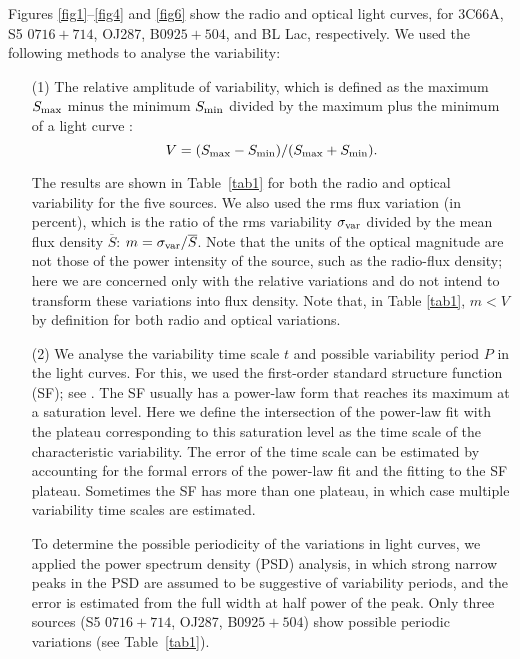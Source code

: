 \documentclass[a4paper,fleqn,usenatbib]{mnras}
\begin{document}
Figures \ref{fig1}--\ref{fig4} and \ref{fig6} show the radio and optical light curves, for 3C66A, S5 \(0716+714\), OJ287, B\(0925+504\), and BL Lac, respectively. We used the following methods to analyse the variability:
\begin{itemize}
\item[(1)] The relative amplitude of variability, which is defined as the maximum \(S_{\rm max}\) minus the minimum \(S_{\rm min}\) divided by the maximum plus the minimum of a light curve \citep{kova05}:
\begin{equation}
V = (S_{\rm max}-S_{\rm min})/(S_{\rm max}+S_{\rm min}).
\end{equation}

The results are shown in  Table~\ref{tab1} for both the radio and optical variability for the five sources. We also used the rms flux variation (in percent), which is the ratio of the rms variability \(\sigma_{\rm var}\) divided by the mean flux density \(\overline{S}\): \(m=\sigma_{\rm var}/\overline{S}\). Note that the units of the optical magnitude are not those of the power intensity of the source, such as the radio-flux density; here we are concerned only with the relative variations and do not intend to transform these variations into flux density. Note that, in Table \ref{tab1}, \(m<V\) by definition for both radio and optical variations.

\item[(2)] We analyse the variability time scale \(t\) and possible variability period \(P\) in the light curves. For this, we used the first-order standard
structure function (SF); see \cite{sim85}. The SF usually has a power-law form that
reaches its maximum at a saturation level. Here we define the intersection of
the power-law fit with the plateau corresponding to this saturation
level as the time scale of the characteristic variability. The error
of the time scale can be estimated by accounting for
the formal errors of the power-law fit and the fitting to the
SF plateau. Sometimes the SF has more
than one plateau, in which case multiple variability
time scales are estimated.

To determine the possible periodicity of the variations in light curves, we applied the power spectrum density (PSD) analysis, in which strong narrow peaks in the PSD are assumed to be suggestive of variability periods, and the error is estimated from the full width at half power of the peak. Only three sources (S5 \(0716+714\), OJ287, B\(0925+504\)) show possible periodic variations (see Table~\ref{tab1}).


\end{itemize}
\end{document}

